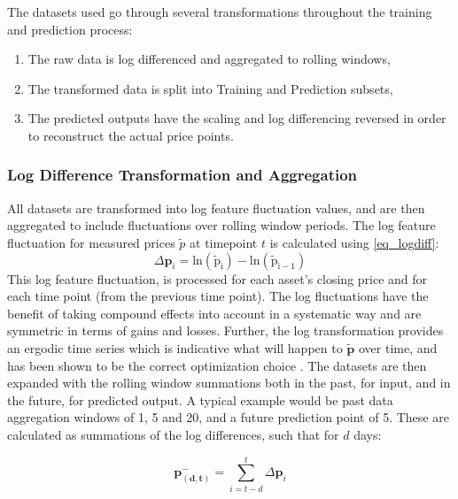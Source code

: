 \documentclass[a4paper,11pt,oneside]{article}
\theoremstyle{plain}
\theoremstyle{definition}
\begin{document}
	The datasets used go through several transformations throughout the training and prediction process:
	
	\begin{enumerate}
		\item The raw data is log differenced and aggregated to rolling windows,
		\item The transformed data is split into Training and Prediction subsets,
		\item The predicted outputs have the scaling and log differencing reversed in order to reconstruct the actual price points.
	\end{enumerate}
		
	\subsubsection{Log Difference Transformation and Aggregation}\label{ldata_og_difference}
	All datasets are transformed into log feature fluctuation values, and are then aggregated to include fluctuations over rolling window periods. The log feature fluctuation for measured prices $\tilde{p}$ at timepoint $t$ is calculated using \eqref{eq_logdiff}:
	\begin{equation}\label{eq_logdiff}
	\Delta\mathbf{p}_i = \mathrm{ln(\tilde{p}_i) - \mathrm{ln}(\tilde{p}_{i-1})}
	\end{equation}
	This log feature fluctuation,  is processed for each asset's closing price and for each time point (from the previous time point). The log fluctuations have the benefit of taking compound effects into account in a systematic way and are symmetric in terms of gains and losses. Further, the log transformation provides an ergodic time series which is indicative what will happen to $\mathbf{\tilde{p}}$ over time, and has been shown to be the correct optimization choice \citep{Peters}.
	\newline\newline
	The datasets are then expanded with the rolling window summations both in the past, for input, and in the future, for predicted output. A typical example would be past data aggregation windows of 1, 5 and 20, and a future prediction point of 5. These are calculated as summations of the log differences, such that for $d$ days:
	
	\begin{equation}\label{eq_price_agg_past}
	 \mathbf{p^{-}_{(d,t)}} = \sum_{i = t-d}^{t} \Delta\mathbf{p}_i
	\end{equation}
	
\end{document}
